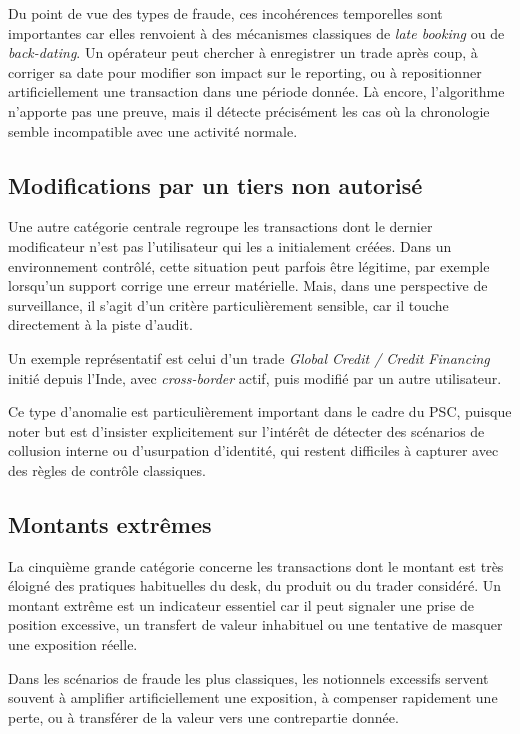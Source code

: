\documentclass[a4paper]{article}
\begin{document}
Du point de vue des types de fraude, ces incohérences temporelles sont importantes car elles renvoient à des mécanismes classiques de \textit{late booking} ou de \textit{back-dating}. Un opérateur peut chercher à enregistrer un trade après coup, à corriger sa date pour modifier son impact sur le reporting, ou à repositionner artificiellement une transaction dans une période donnée. Là encore, l'algorithme n'apporte pas une preuve, mais il détecte précisément les cas où la chronologie semble incompatible avec une activité normale.

\subsection{Modifications par un tiers non autorisé}

Une autre catégorie centrale regroupe les transactions dont le dernier modificateur n'est pas l'utilisateur qui les a initialement créées. Dans un environnement contrôlé, cette situation peut parfois être légitime, par exemple lorsqu'un support corrige une erreur matérielle. Mais, dans une perspective de surveillance, il s'agit d'un critère particulièrement sensible, car il touche directement à la piste d'audit.

Un exemple représentatif est celui d'un trade \textit{Global Credit / Credit Financing} initié depuis l'Inde, avec \textit{cross-border} actif, puis modifié par un autre utilisateur. 

Ce type d'anomalie est particulièrement important dans le cadre du PSC, puisque noter but est d'insister explicitement sur l'intérêt de détecter des scénarios de collusion interne ou d'usurpation d'identité, qui restent difficiles à capturer avec des règles de contrôle classiques. 


\subsection{Montants extrêmes}

La cinquième grande catégorie concerne les transactions dont le montant est très éloigné des pratiques habituelles du desk, du produit ou du trader considéré. Un montant extrême est un indicateur essentiel car il peut signaler une prise de position excessive, un transfert de valeur inhabituel ou une tentative de masquer une exposition réelle.

Dans les scénarios de fraude les plus classiques, les notionnels excessifs servent souvent à amplifier artificiellement une exposition, à compenser rapidement une perte, ou à transférer de la valeur vers une contrepartie donnée. 
\end{document}
